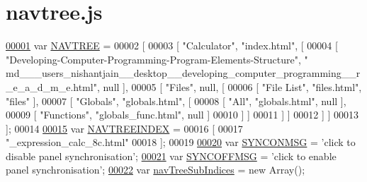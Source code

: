 \hypertarget{navtree_8js_source}{\section{navtree.\+js}
\label{navtree_8js_source}
}

\begin{DoxyCode}
\hypertarget{navtree_8js_source_l00001}{}\hyperlink{navtree_8js_afc3e53a71ba26a8215797019b9b1451b}{00001} var \hyperlink{navtree_8js_afc3e53a71ba26a8215797019b9b1451b}{NAVTREE} =
00002 [
00003   [ \textcolor{stringliteral}{"Calculator"}, \textcolor{stringliteral}{"index.html"}, [
00004     [ \textcolor{stringliteral}{"Developing-Computer-Programming-Program-Elements-Structure"}, \textcolor{stringliteral}{"
      md\_\_\_users\_nishantjain\_\_desktop\_\_developing\_computer\_programming\_\_r\_e\_a\_d\_m\_e.html"}, null ],
00005     [ \textcolor{stringliteral}{"Files"}, null, [
00006       [ \textcolor{stringliteral}{"File List"}, \textcolor{stringliteral}{"files.html"}, \textcolor{stringliteral}{"files"} ],
00007       [ \textcolor{stringliteral}{"Globals"}, \textcolor{stringliteral}{"globals.html"}, [
00008         [ \textcolor{stringliteral}{"All"}, \textcolor{stringliteral}{"globals.html"}, null ],
00009         [ \textcolor{stringliteral}{"Functions"}, \textcolor{stringliteral}{"globals\_func.html"}, null ]
00010       ] ]
00011     ] ]
00012   ] ]
00013 ];
00014 
\hypertarget{navtree_8js_source_l00015}{}\hyperlink{navtree_8js_a51b2088f00a4f2f20d495e65be359cd8}{00015} var \hyperlink{navtree_8js_a51b2088f00a4f2f20d495e65be359cd8}{NAVTREEINDEX} =
00016 [
00017 \textcolor{stringliteral}{"\_expression\_calc\_8c.html"}
00018 ];
00019 
\hypertarget{navtree_8js_source_l00020}{}\hyperlink{navtree_8js_ab31fdb4752a1ada1b708d49d7482f948}{00020} var \hyperlink{navtree_8js_ab31fdb4752a1ada1b708d49d7482f948}{SYNCONMSG} = \textcolor{stringliteral}{'click to disable panel synchronisation'};
\hypertarget{navtree_8js_source_l00021}{}\hyperlink{navtree_8js_a8b93d8f469f8aeb3a0c17b922a2d32ed}{00021} var \hyperlink{navtree_8js_a8b93d8f469f8aeb3a0c17b922a2d32ed}{SYNCOFFMSG} = \textcolor{stringliteral}{'click to enable panel synchronisation'};
\hypertarget{navtree_8js_source_l00022}{}\hyperlink{navtree_8js_aee39e0d4ab2646ada03125bd7e750cf7}{00022} var \hyperlink{navtree_8js_aee39e0d4ab2646ada03125bd7e750cf7}{navTreeSubIndices} = \textcolor{keyword}{new} Array();

\end{DoxyCode}
